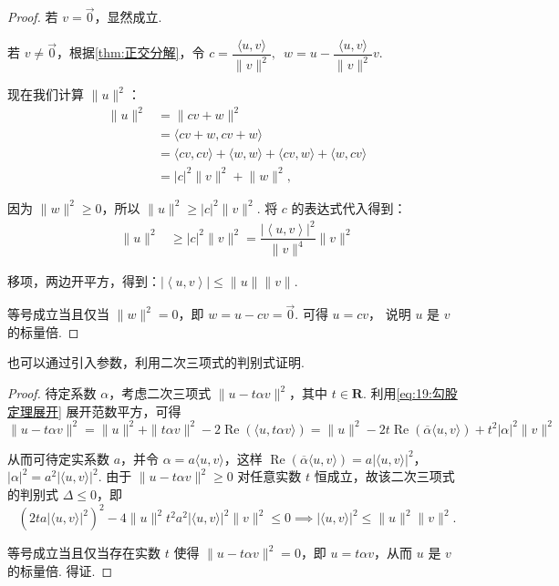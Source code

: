 \begin{proof}
    若 $v = \vec{0}$，显然成立.

    若 $v \neq \vec{0}$，根据\autoref{thm:正交分解}，令 $ c = \dfrac{\langle u, v\rangle}{\lVert v \rVert^2}, \enspace w = u - \dfrac{\langle u, v\rangle}{\lVert v \rVert^2}v$.

    现在我们计算 $\lVert u \rVert^2$：
    \begin{align*}
        \lVert u \rVert^2 & = \lVert c v + w \rVert^2 \\
                          & = \langle c v + w, c v + w \rangle \\
                          & = \langle c v, c v \rangle + \langle w, w \rangle + \langle c v, w \rangle + \langle w, c v \rangle \\
                          & = \lvert c \rvert^2\lVert v \rVert^2 + \lVert w \rVert^2,
    \end{align*}

    因为 $\lVert w \rVert^2 \geqslant 0$，所以 $\lVert u \rVert^2 \geqslant \lvert c \rvert^2\lVert v \rVert^2$. 将 $ c $ 的表达式代入得到：
    \begin{align*}
        \lVert u \rVert^2 & \geqslant \lvert c \rvert^2\lVert v \rVert^2 = \dfrac{\left\lvert \left\langle u, v\right\rangle \right\rvert^2}{\lVert v \rVert^4}\lVert v \rVert^2
    \end{align*}

    移项，两边开平方，得到：$\left\lvert \left\langle u, v\right\rangle \right\rvert \leqslant \lVert u \rVert\lVert v \rVert$.

    等号成立当且仅当 $\lVert w \rVert^2 = 0$，即 $ w = u - cv = \vec{0}$. 可得 $ u = c v $， 说明 $ u $ 是 $ v $ 的标量倍.
\end{proof}

也可以通过引入参数，利用二次三项式的判别式证明.

\begin{proof}
待定系数 $\alpha$，考虑二次三项式 $\|u - t \alpha v\|^2$，其中 $t \in \mathbf{R}$. 利用\autoref{eq:19:勾股定理展开} 展开范数平方，可得
\[
\|u - t \alpha v\|^2 = \|u\|^2 + \|t\alpha v\|^2 - 2\operatorname{Re}(\langle u, t\alpha v \rangle) = \|u\|^2 - 2t \operatorname{Re}(\overline{\alpha} \langle u, v \rangle) + t^2 \lvert \alpha \rvert^2 \|v\|^2
\]

从而可待定实系数 $a$，并令 $\alpha = a\langle u, v \rangle$，这样 $\operatorname{Re}(\overline{\alpha} \langle u, v \rangle) = a\lvert \langle u, v \rangle \rvert^2$，$|\alpha|^2 = a^2\lvert \langle u, v \rangle \rvert^2$. 由于 $\|u - t \alpha v\|^2 \geqslant 0$ 对任意实数 $t$ 恒成立，故该二次三项式的判别式 $\Delta \leqslant 0$，即
\[
(2t a\lvert \langle u, v \rangle \rvert^2)^2 - 4\|u\|^2 t^2 a^2 \lvert \langle u, v \rangle \rvert^2 \|v\|^2 \leqslant 0 \implies \lvert \langle u, v \rangle \rvert^2 \leqslant \|u\|^2 \|v\|^2.
\]

等号成立当且仅当存在实数 $t$ 使得 $\|u - t \alpha v\|^2 = 0$，即 $u = t \alpha v$，从而 $u$ 是 $v$ 的标量倍. 得证.
\end{proof}

